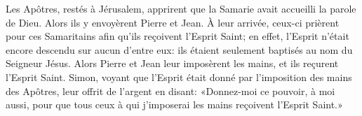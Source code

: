 Les Apôtres, restés à Jérusalem,
	apprirent que la Samarie avait accueilli la parole de Dieu.
	Alors ils y envoyèrent Pierre et Jean.
À leur arrivée, ceux-ci prièrent pour ces Samaritains
	afin qu’ils reçoivent l’Esprit Saint;
	en effet, l’Esprit n’était encore descendu sur aucun d’entre eux:
	ils étaient seulement baptisés au nom du Seigneur Jésus.
Alors Pierre et Jean leur imposèrent les mains,
	et ils reçurent l’Esprit Saint.
Simon, voyant que l’Esprit était donné par l’imposition des mains des Apôtres,
	leur offrit de l’argent en disant:
	«Donnez-moi ce pouvoir, à moi aussi,
	pour que tous ceux à qui j’imposerai les mains reçoivent l’Esprit Saint.»
